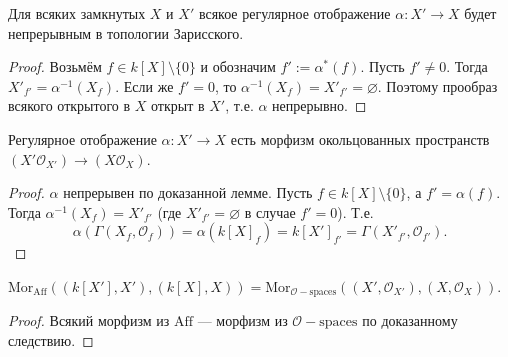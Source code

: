\documentclass[12pt,a4paper]{article}
\newcommand{\Aff}{\mathrm{Aff}}
\newcommand{\Mor}{\mathrm{Mor}}
\newcommand{\Ospaces}{\mathrm{\mathcal{O}-spaces}}
\begin{document}
    \begin{lemma}
        Для всяких замкнутых $X$ и $X'$ всякое регулярное отображение $\alpha: X' \to X$ будет непрерывным в топологии Зарисского.
    \end{lemma}

    \begin{proof}
        Возьмём $f \in k[X] \setminus \{0\}$ и обозначим $f' := \alpha^*(f)$. Пусть $f' \neq 0$. Тогда $X'_{f'} = \alpha^{-1}(X_f)$. Если же $f' = 0$, то $\alpha^{-1}(X_f) = X'_{f'} = \varnothing$. Поэтому прообраз всякого открытого в $X$ открыт в $X'$, т.е. $\alpha$ непрерывно.
    \end{proof}

    \begin{corollary}
        Регулярное отображение $\alpha: X' \to X$ есть морфизм окольцованных пространств $(X' \mathcal{O}_{X'}) \to (X \mathcal{O}_{X})$.
    \end{corollary}

    \begin{proof}
        $\alpha$ непрерывен по доказанной лемме. Пусть $f \in k[X] \setminus \{0\}$, а $f' = \alpha(f)$. Тогда $\alpha^{-1}(X_f) = X'_{f'}$ (где $X'_{f'} = \varnothing$ в случае $f' = 0$). Т.е.
        \[\alpha(\Gamma(X_f, \mathcal{O}_f)) = \alpha(k[X]_f) = k[X']_{f'} = \Gamma(X'_{f'}, \mathcal{O}_{f'}).\]
    \end{proof}

    \begin{lemma}
        $\Mor_{\Aff}((k[X'], X'), (k[X], X)) = \Mor_{\Ospaces}((X', \mathcal{O}_{X'}), (X, \mathcal{O}_{X}))$.
    \end{lemma}

    \begin{proof}
        Всякий морфизм из $\Aff$ --- морфизм из $\Ospaces$ по доказанному следствию.
    \end{proof}
\end{document}
